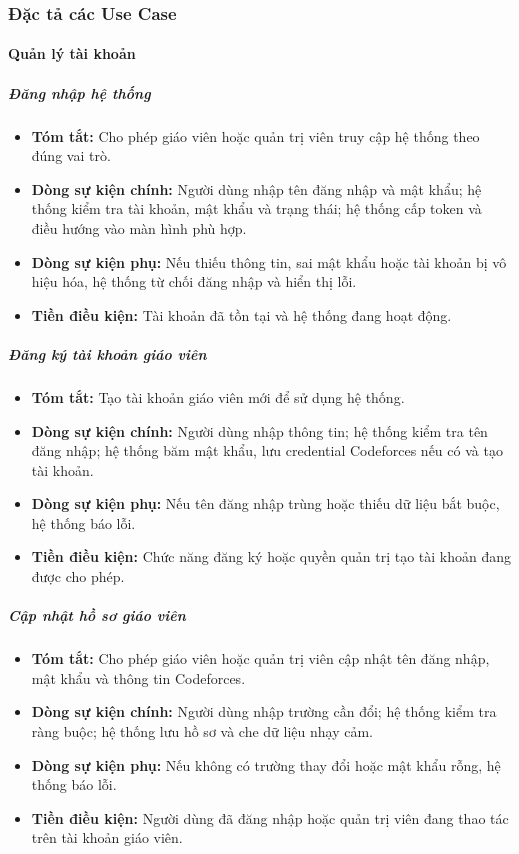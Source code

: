 \documentclass[12pt,a4paper]{article}
\begin{document}
\subsubsection{Đặc tả các Use Case}

\paragraph{Quản lý tài khoản}

\subparagraph{Đăng nhập hệ thống}
\begin{itemize}[leftmargin=*]
\item \textbf{Tóm tắt:} Cho phép giáo viên hoặc quản trị viên truy cập hệ thống theo đúng vai trò.
\item \textbf{Dòng sự kiện chính:} Người dùng nhập tên đăng nhập và mật khẩu; hệ thống kiểm tra tài khoản, mật khẩu và trạng thái; hệ thống cấp token và điều hướng vào màn hình phù hợp.
\item \textbf{Dòng sự kiện phụ:} Nếu thiếu thông tin, sai mật khẩu hoặc tài khoản bị vô hiệu hóa, hệ thống từ chối đăng nhập và hiển thị lỗi.
\item \textbf{Tiền điều kiện:} Tài khoản đã tồn tại và hệ thống đang hoạt động.
\end{itemize}

\subparagraph{Đăng ký tài khoản giáo viên}
\begin{itemize}[leftmargin=*]
\item \textbf{Tóm tắt:} Tạo tài khoản giáo viên mới để sử dụng hệ thống.
\item \textbf{Dòng sự kiện chính:} Người dùng nhập thông tin; hệ thống kiểm tra tên đăng nhập; hệ thống băm mật khẩu, lưu credential Codeforces nếu có và tạo tài khoản.
\item \textbf{Dòng sự kiện phụ:} Nếu tên đăng nhập trùng hoặc thiếu dữ liệu bắt buộc, hệ thống báo lỗi.
\item \textbf{Tiền điều kiện:} Chức năng đăng ký hoặc quyền quản trị tạo tài khoản đang được cho phép.
\end{itemize}

\subparagraph{Cập nhật hồ sơ giáo viên}
\begin{itemize}[leftmargin=*]
\item \textbf{Tóm tắt:} Cho phép giáo viên hoặc quản trị viên cập nhật tên đăng nhập, mật khẩu và thông tin Codeforces.
\item \textbf{Dòng sự kiện chính:} Người dùng nhập trường cần đổi; hệ thống kiểm tra ràng buộc; hệ thống lưu hồ sơ và che dữ liệu nhạy cảm.
\item \textbf{Dòng sự kiện phụ:} Nếu không có trường thay đổi hoặc mật khẩu rỗng, hệ thống báo lỗi.
\item \textbf{Tiền điều kiện:} Người dùng đã đăng nhập hoặc quản trị viên đang thao tác trên tài khoản giáo viên.
\end{itemize}
\end{document}
